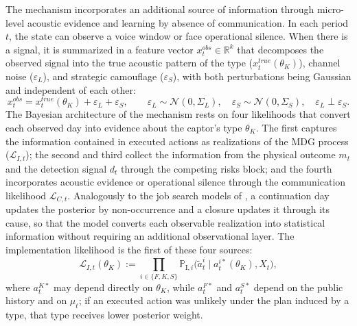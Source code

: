 \documentclass[ecta,nameyear,draft]{econsocart}
\theoremstyle{plain}
\theoremstyle{definition}
\newcommand{\1}{\mathbf{1}}
\newcommand{\ProbI}[1]{\mathbb{P}_{\mathrm{I},#1}}
\begin{document}
The mechanism incorporates an additional source of information through micro-level acoustic evidence and learning by absence of communication. In each period $t$, the state can observe a voice window or face operational silence. When there is a signal, it is summarized in a feature vector $x_t^{obs}\in\mathbb{R}^k$ that decomposes the observed signal into the true acoustic pattern of the type ($x_t^{true}(\theta_K)$), channel noise ($\varepsilon_L$), and strategic camouflage ($\varepsilon_S$), with both perturbations being Gaussian and independent of each other:
\begin{equation}
x_t^{obs}=x_t^{true}(\theta_K)+\varepsilon_L+\varepsilon_S,\qquad\varepsilon_L\sim\mathcal{N}(0,\Sigma_L),\quad\varepsilon_S\sim\mathcal{N}(0,\Sigma_S),\quad\varepsilon_L\perp\varepsilon_S.
\label{eq:voz-descomp}
\end{equation}
The Bayesian architecture of the mechanism rests on four likelihoods that convert each observed day into evidence about the captor's type $\theta_K$. The first captures the information contained in executed actions as realizations of the MDG process ($\mathcal{L}_{I,t}$); the second and third collect the information from the physical outcome $m_t$ and the detection signal $d_t$ through the competing risks block; and the fourth incorporates acoustic evidence or operational silence through the communication likelihood $\mathcal{L}_{C,t}$. Analogously to the job search models of \citet{McCall1970}, a continuation day updates the posterior by non-occurrence and a closure updates it through its cause, so that the model converts each observable realization into statistical information without requiring an additional observational layer. The implementation likelihood is the first of these four sources:
\begin{equation}
\mathcal{L}_{I,t}(\theta_K):=\prod_{i\in\{F,K,S\}}\ProbI{i}\!\bigl(\tilde{a}_t^i\mid a_t^{i\ast}(\theta_K),X_t\bigr),
\label{eq:LI-atilde}
\end{equation}
where $a_t^{K\ast}$ may depend directly on $\theta_K$, while $a_t^{F\ast}$ and $a_t^{S\ast}$ depend on the public history and on $\mu_t$; if an executed action was unlikely under the plan induced by a type, that type receives lower posterior weight.
\end{document}

